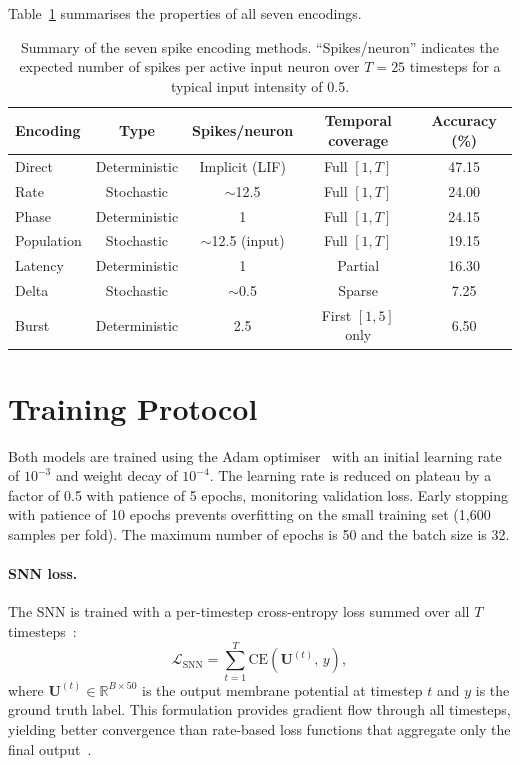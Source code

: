 Table~\ref{tab:encodings} summarises the properties of all seven encodings.

\begin{table}[t]
\centering
\caption{Summary of the seven spike encoding methods. ``Spikes/neuron'' indicates the expected number of spikes per active input neuron over $T = 25$ timesteps for a typical input intensity of 0.5.}
\label{tab:encodings}
\small
\begin{tabular}{@{}lcccc@{}}
\toprule
\textbf{Encoding} & \textbf{Type} & \textbf{Spikes/neuron} & \textbf{Temporal coverage} & \textbf{Accuracy (\%)} \\
\midrule
Direct     & Deterministic & Implicit (LIF) & Full $[1, T]$ & 47.15 \\
Rate       & Stochastic    & $\sim$12.5      & Full $[1, T]$ & 24.00 \\
Phase      & Deterministic & 1               & Full $[1, T]$ & 24.15 \\
Population & Stochastic    & $\sim$12.5 (input) & Full $[1, T]$ & 19.15 \\
Latency    & Deterministic & 1               & Partial        & 16.30 \\
Delta      & Stochastic    & $\sim$0.5       & Sparse         & 7.25 \\
Burst      & Deterministic & 2.5             & First $[1, 5]$ only & 6.50 \\
\bottomrule
\end{tabular}
\end{table}

\section{Training Protocol}
\label{sec:training}

Both models are trained using the Adam optimiser~\citep{kingma2015adam} with an initial learning rate of $10^{-3}$ and weight decay of $10^{-4}$. The learning rate is reduced on plateau by a factor of 0.5 with patience of 5 epochs, monitoring validation loss. Early stopping with patience of 10 epochs prevents overfitting on the small training set (1,600 samples per fold). The maximum number of epochs is 50 and the batch size is 32.

\paragraph{SNN loss.}
The SNN is trained with a per-timestep cross-entropy loss summed over all $T$ timesteps~\citep{eshraghian2023training}:
\begin{equation}
\label{eq:snn-loss}
\mathcal{L}_{\text{SNN}} = \sum_{t=1}^{T} \text{CE}\!\left(\mathbf{U}^{(t)},\, y\right),
\end{equation}
where $\mathbf{U}^{(t)} \in \mathbb{R}^{B \times 50}$ is the output membrane potential at timestep $t$ and $y$ is the ground truth label. This formulation provides gradient flow through all timesteps, yielding better convergence than rate-based loss functions that aggregate only the final output~\citep{eshraghian2023training}.

